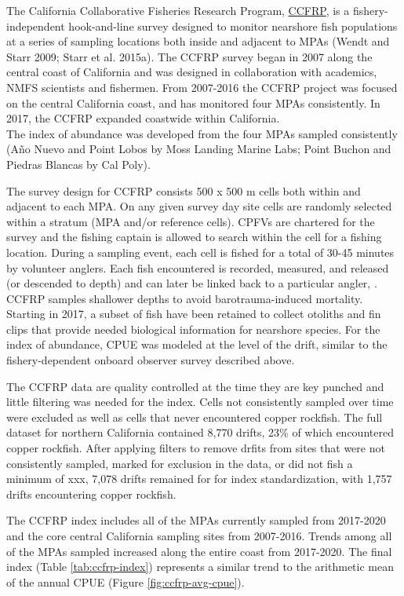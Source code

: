 \documentclass[11pt,
  english,
  letterpaper,
]{article}
\begin{document}
The California Collaborative Fisheries Research Program, \href{https://www.mlml.calstate.edu/ccfrp/}{CCFRP}, is a fishery-independent hook-and-line survey designed to monitor nearshore fish populations at a series of sampling locations both inside and adjacent to MPAs (Wendt and Starr 2009; Starr et al. 2015a). The CCFRP survey began in 2007 along the central coast of California and was designed in collaboration with academics, NMFS scientists and fishermen. From 2007-2016 the CCFRP project was focused on the central California coast, and has monitored four MPAs consistently. In 2017, the CCFRP expanded coastwide within California.\\
The index of abundance was developed from the four MPAs sampled consistently (Año Nuevo and Point Lobos by Moss Landing Marine Labs; Point Buchon and Piedras Blancas by Cal Poly).

The survey design for CCFRP consists 500 x 500 m cells both within and adjacent to each MPA. On any given survey day site cells are randomly selected within a stratum (MPA and/or reference cells). CPFVs are chartered for the survey and the fishing captain is allowed to search within the cell for a fishing location. During a sampling event, each cell is fished for a total of 30-45 minutes by volunteer anglers. Each fish encountered is recorded, measured, and released (or descended to depth) and can later be linked back to a particular angler, . CCFRP samples shallower depths to avoid barotrauma-induced mortality.\\
Starting in 2017, a subset of fish have been retained to collect otoliths and fin clips that provide needed biological information for nearshore species. For the index of abundance, CPUE was modeled at the level of the drift, similar to the fishery-dependent onboard observer survey described above.

The CCFRP data are quality controlled at the time they are key punched and little filtering was needed for the index. Cells not consistently sampled over time were excluded as well as cells that never encountered copper rockfish. The full dataset for northern California contained 8,770 drifts, 23\% of which encountered copper rockfish. After applying filters to remove drfits from sites that were not consistently sampled, marked for exclusion in the data, or did not fish a minimum of xxx, 7,078 drifts remained for for index standardization, with 1,757 drifts encountering copper rockfish.

The CCFRP index includes all of the MPAs currently sampled from 2017-2020 and the core central California sampling sites from 2007-2016. Trends among all of the MPAs sampled increased along the entire coast from 2017-2020. The final index (Table \ref{tab:ccfrp-index}) represents a similar trend to the arithmetic mean of the annual CPUE (Figure \ref{fig:ccfrp-avg-cpue}).
\end{document}
